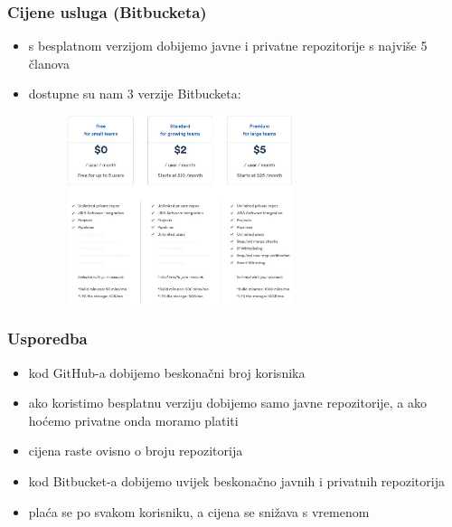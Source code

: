 \documentclass[12p, Times New Roman]{beamer}
\begin{document}
	\begin{frame} 				%
		\frametitle{Cijene usluga (Bitbucketa)}

		\begin{itemize}
			\item s besplatnom verzijom dobijemo javne i privatne repozitorije s najviše 5 članova
			\item dostupne su nam 3 verzije Bitbucketa: 
			

		\end{itemize}

		\begin{figure}
			\begin{center}
				\includegraphics[width=8cm, height=5.5cm]{priceb.png}
			\end{center}
		\end{figure}
	\end{frame}




	\begin{frame}				%
		\frametitle{Usporedba}
		\begin{itemize}
			\item kod GitHub-a dobijemo beskonačni broj korisnika 
			\item ako koristimo besplatnu verziju dobijemo samo javne repozitorije, a ako hoćemo privatne onda moramo platiti
			\item cijena raste ovisno o broju repozitorija
			\item kod Bitbucket-a dobijemo uvijek beskonačno javnih i privatnih repozitorija
			\item plaća se po svakom korisniku, a cijena se snižava s vremenom

		\end{itemize}

	\end{frame}
\end{document}

